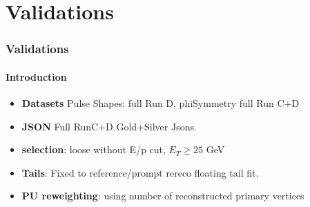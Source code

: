 \documentclass[8pt,serif]{beamer}
\begin{document}
\section{Validations}
\begin{frame}
\frametitle{Validations}
\framesubtitle{Introduction}

\vspace{10mm}

\begin{itemize}
\item \textbf{Datasets} Pulse Shapes: full Run D, phiSymmetry full Run C+D
\item \textbf{JSON} Full RunC+D Gold+Silver Jsons.
\item \textbf{selection}:  loose without E/p cut, $E_T \geq 25$ GeV
\item \textbf{Tails}: Fixed to reference/prompt rereco floating tail fit. 
\item \textbf{PU reweighting}: using number of reconstructed primary vertices
\end{itemize}
  
\end{frame}
\end{document}
